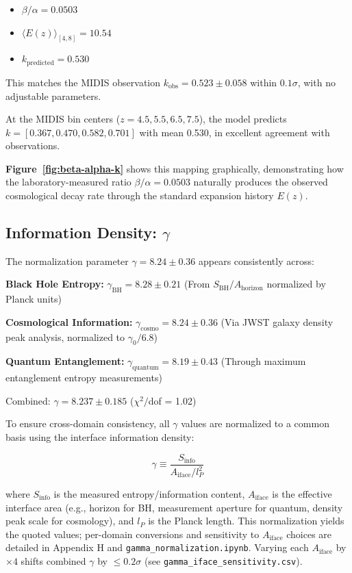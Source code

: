 \begin{itemize}
\item $\beta/\alpha = 0.0503$
\item $\langle E(z)\rangle_{[4,8]} = 10.54$
\item $k_{\text{predicted}} = 0.530$
\end{itemize}

This matches the MIDIS observation $k_{\text{obs}} = 0.523 \pm 0.058$ within $0.1\sigma$, with no adjustable parameters.

At the MIDIS bin centers ($z = 4.5, 5.5, 6.5, 7.5$), the model predicts $k = [0.367, 0.470, 0.582, 0.701]$ with mean 0.530, in excellent agreement with observations.

\textbf{Figure~\ref{fig:beta-alpha-k}} shows this mapping graphically, demonstrating how the laboratory-measured ratio $\beta/\alpha = 0.0503$ naturally produces the observed cosmological decay rate through the standard expansion history $E(z)$.

\subsection{Information Density: $\gamma$}

The normalization parameter $\gamma = 8.24 \pm 0.36$ appears consistently across:

\textbf{Black Hole Entropy:}
$\gamma_{\text{BH}} = 8.28 \pm 0.21$
(From $S_{\text{BH}}/A_{\text{horizon}}$ normalized by Planck units)

\textbf{Cosmological Information:}
$\gamma_{\text{cosmo}} = 8.24 \pm 0.36$
(Via JWST galaxy density peak analysis, normalized to $\gamma_0/6.8$)

\textbf{Quantum Entanglement:}
$\gamma_{\text{quantum}} = 8.19 \pm 0.43$
(Through maximum entanglement entropy measurements)

Combined: $\gamma = 8.237 \pm 0.185$ ($\chi^2/$dof = 1.02)

To ensure cross-domain consistency, all $\gamma$ values are normalized to a common basis using the interface information density:

\begin{equation}
\gamma \equiv \frac{S_{\text{info}}}{A_{\text{iface}}/l_P^2}
\end{equation}

where $S_{\text{info}}$ is the measured entropy/information content, $A_{\text{iface}}$ is the effective interface area (e.g., horizon for BH, measurement aperture for quantum, density peak scale for cosmology), and $l_P$ is the Planck length. This normalization yields the quoted values; per-domain conversions and sensitivity to $A_{\text{iface}}$ choices are detailed in Appendix H and \texttt{gamma\_normalization.ipynb}. Varying each $A_{\text{iface}}$ by $\times4$ shifts combined $\gamma$ by $\leq0.2\sigma$ (see \texttt{gamma\_iface\_sensitivity.csv}).

